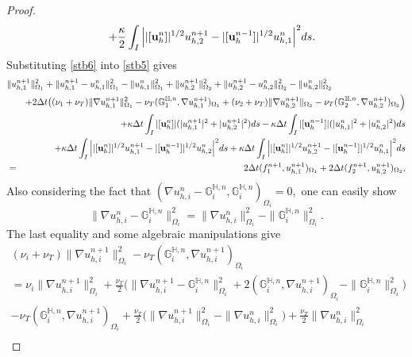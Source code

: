 \documentclass[10pt]{article}%
\numberwithin{equation}{section}
\newcommand{\bff}{{  f}}
\newcommand{\bu}{{\bf u}}
\begin{document}
\begin{proof}
\begin{eqnarray}
	&&+\dfrac{\kappa}{2} \int_{I}\Big{|}|[\bu_h^n]|^{1/2}u_{h,2}^{n+1}-|[\bu_h^{n-1}]|^{1/2}u_{h,1}^{n}\Big{|}^2ds. \label{stb6}
	\end{eqnarray}
	Substituting \eqref{stb6} into \eqref{stb5} gives
	\begin{eqnarray}
	\lefteqn{\|{u^{n+1}_{h,1}}\|_{\Omega_1}^2+\|{{u^{n+1}_{h,1}}-u_{h,1}^{n}}\|_{\Omega_1}^2-\|{u^{n}_{h,1}}\|_{\Omega_1}^2 +\|{u^{n+1}_{h,2}}\|_{\Omega_2}^2+\|{{u^{n+1}_{h,2}}-u_{h,2}^{n}}\|_{\Omega_2}^2-\|{u^{n}_{h,2}}\|_{\Omega_2}^2}\nonumber\\
	&&+2\Delta t\big((\nu_1+\nu_T)\|\nabla  u_{h,1}^{n+1}\|^2_{\Omega_1}-\nu_T (\mathbb{G}_1^{\mathbb{H},n},\nabla u_{h,1}^{n+1})_{\Omega_1}+(\nu_2+\nu_T) \|\nabla  {u}_{h,2}^{n+1}\|_{\Omega_2}-\nu_T (\mathbb{G}_2^{\mathbb{H},n},\nabla u_{h,2}^{n+1})_{\Omega_2}\Big) \nonumber\\
	&&+\kappa \Delta t \int_{I}|[\bu_h^n]| (|u_{h,1}^{n+1}|^2+|u_{h,2}^{n+1}|^2)ds
	- \kappa \Delta t\int_{I}|[\bu_h^{n-1}]| (|u_{h,1}^{n}|^2+|u_{h,2}^{n}|^2)ds\nonumber\\
	&&+\kappa \Delta t \int_{I}\Big{|}|[\bu_h^n]|^{1/2}u_{h,1}^{n+1}-|[\bu_h^{n-1}]|^{1/2}u_{h,2}^{n}\Big{|}^2ds
	+\kappa \Delta t \int_{I}\Big{|}|[\bu_h^n]|^{1/2}u_{h,2}^{n+1}-|[\bu_h^{n-1}]|^{1/2}u_{h,1}^{n}\Big{|}^2ds \nonumber\\
	&=&2\Delta t(\bff_1^{n+1},u_{h,1}^{n+1})_{\Omega_1}+2\Delta t(\bff_2^{n+1},u_{h,2}^{n+1})_{\Omega_2},\label{stb7}
	\end{eqnarray}
	    Also considering the fact that $(\nabla u_{h,i}^n - \mathbb{G}_i^{\mathbb{H},n}, \mathbb{G}_i^{\mathbb{H},n})_{\Omega_i}=0,$ one can easily show
\begin{equation}
\|\nabla u_{h,i}^{n} - \mathbb{G}_i^{\mathbb{H},n}\|^2_{\Omega_i}=
\|\nabla u_{h,i}^{n}\|^2_{\Omega_i}-\|\mathbb{G}_i^{\mathbb{H},n}\|^2_{\Omega_i}. \nonumber
\end{equation}
The last equality and some algebraic manipulations give
\begin{eqnarray}
(\nu_i+\nu_T)\|\nabla  u_{h,i}^{n+1}\|^2_{\Omega_i} - \nu_T(\mathbb{G}_i^{\mathbb{H},n},\nabla u_{h,i}^{n+1})_{\Omega_i} \nonumber\\
=
\nu_i\|\nabla  u_{h,i}^{n+1}\|^2_{\Omega_i} + \frac{\nu_T}{2}\big(\|\nabla  u_{h,i}^{n+1} - \mathbb{G}_i^{\mathbb{H},n}\|^2_{\Omega_i} + 2(\mathbb{G}_i^{\mathbb{H},n},\nabla u_{h,i}^{n+1})_{\Omega_i} - \|\mathbb{G}_i^{\mathbb{H},n}\|^2_{\Omega_i} \big) \nonumber \\
-\nu_T (\mathbb{G}_i^{\mathbb{H},n},\nabla u_{h,i}^{n+1})_{\Omega_i} +\frac{\nu_T}{2}\big(\|\nabla  u_{h,i}^{n+1}\|^2_{\Omega_i} - \|\nabla  u_{h,i}^{n}\|^2_{\Omega_i}\big) +\frac{\nu_T}{2} \|\nabla  u_{h,i}^{n}\|^2_{\Omega_i} \nonumber \\

\end{eqnarray}
\end{proof}
\end{document}
